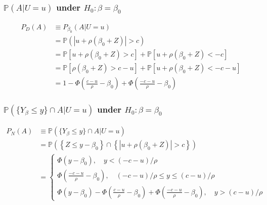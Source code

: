 \begin{frame}
  \frametitle{$\mathbb{P}(A|U=u)$ under $H_0\colon \beta = \beta_0$}

\begin{align*}
  P_D(A) &\equiv P_{\beta_0}(A|U=u)\\
  &= \mathbb{P}\left(|u + \rho (\beta_0 + Z)| > c\right) \\
  &= \mathbb{P}\left[ u + \rho(\beta_0 + Z) > c \right]  + \mathbb{P}\left[ u + \rho(\beta_0 + Z) < -c \right] \\
  &= \mathbb{P}\left[ \rho(\beta_0 + Z) > c-u \right]  + \mathbb{P}\left[ u + \rho(\beta_0 + Z) < -c-u \right] \\ 
    &= 1 - \Phi\left( \displaystyle \frac{c - u}{\rho} - \beta_0 \right) + \Phi\left( \displaystyle \frac{-c- u}{\rho} - \beta_0 \right)
\end{align*}
\end{frame}
\begin{frame}
  \frametitle{$\mathbb{P}(\{Y_{\beta} \leq y\}\cap A|U=u)$ under $H_0\colon \beta = \beta_0$}

  \footnotesize

\begin{align*}
 P_N(A) &\equiv \mathbb{P}(\{Y_{\beta} \leq y\}\cap A|U=u)\\
 &= \mathbb{P}\left(\left\{Z\leq y - \beta_0 \right\}\cap \left\{|u + \rho (\beta_0 + Z)| > c\right\}\right)\\
 &= \left\{
 \begin{array}{l}
   \Phi\left( y - \beta_0 \right), \quad y < (-c - u)/\rho \\
   \Phi\left(\displaystyle \frac{-c-u}{\rho} - \beta_0 \right), \quad (-c - u)/\rho \leq y \leq (c - u)/\rho \\
   \Phi(y - \beta_0) - \Phi\left( \displaystyle \frac{c - u}{\rho} - \beta_0 \right) + \Phi\left(\displaystyle \frac{-c-u}{\rho} - \beta_0 \right), \quad y > (c - u)/\rho 
 \end{array}
 \right.
\end{align*}
\end{frame}
